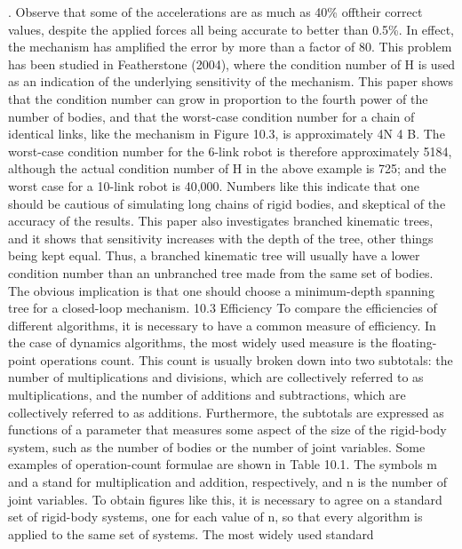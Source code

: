 . Observe that some of the accelerations are as much as 40\% offtheir correct values, despite the applied forces all being accurate to better than 0.5\%. In effect, the mechanism has amplified the error by more than a factor of 80. This problem has been studied in Featherstone (2004), where the condition number of H is used as an indication of the underlying sensitivity of the mechanism. This paper shows that the condition number can grow in proportion to the fourth power of the number of bodies, and that the worst-case condition number for a chain of identical links, like the mechanism in Figure 10.3, is approximately 4N 4 B. The worst-case condition number for the 6-link robot is therefore approximately 5184, although the actual condition number of H in the above example is 725; and the worst case for a 10-link robot is 40,000. Numbers like this indicate that one should be cautious of simulating long chains of rigid bodies, and skeptical of the accuracy of the results. This paper also investigates branched kinematic trees, and it shows that sensitivity increases with the depth of the tree, other things being kept equal. Thus, a branched kinematic tree will usually have a lower condition number than an unbranched tree made from the same set of bodies. The obvious implication is that one should choose a minimum-depth spanning tree for a closed-loop mechanism. 10.3 Efficiency To compare the efficiencies of different algorithms, it is necessary to have a common measure of efficiency. In the case of dynamics algorithms, the most widely used measure is the floating-point operations count. This count is usually broken down into two subtotals: the number of multiplications and divisions, which are collectively referred to as multiplications, and the number of additions and subtractions, which are collectively referred to as additions. Furthermore, the subtotals are expressed as functions of a parameter that measures some aspect of the size of the rigid-body system, such as the number of bodies or the number of joint variables. Some examples of operation-count formulae are shown in Table 10.1. The symbols m and a stand for multiplication and addition, respectively, and n is the number of joint variables. To obtain figures like this, it is necessary to agree on a standard set of rigid-body systems, one for each value of n, so that every algorithm is applied to the same set of systems. The most widely used standard

